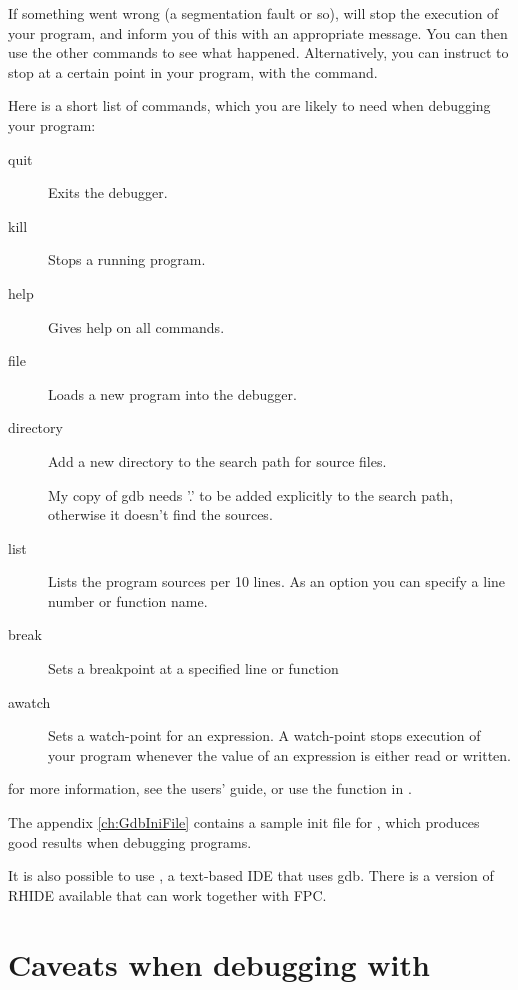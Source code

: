 If something went wrong (a segmentation fault or so),  will stop
the execution of your program, and inform you of this with an appropriate
message. You can then use the other  commands to see what happened.
Alternatively, you can instruct  to stop at a certain point in your
program, with the  command.

Here is a short list of  commands, which you are likely to need when
debugging your program:
\begin{description}
\item [quit\ ] Exits the debugger.
\item [kill\ ] Stops a running program.
\item [help\ ] Gives help on all  commands.
\item [file\ ] Loads a new program into the debugger.
\item [directory\ ] Add a new directory to the search path for source
files.\\
\begin{remark} My copy of gdb needs '.' to be added explicitly to the search
path, otherwise it doesn't find the sources.
\end{remark}
\item [list\ ] Lists the program sources per 10 lines. As an option you can
specify a line number or function name.
\item [break\ ] Sets a breakpoint at a specified line or function
\item [awatch\ ] Sets a watch-point for an expression. A watch-point stops
execution of your program whenever the value of an expression is either
read or written.
\end{description}

for more information, see the  users' guide, or use the 
function in .

The appendix {\ref{ch:GdbIniFile}} contains a sample init file for
, which produces good results when debugging \fpc programs.

It is also possible to use , a text-based IDE that uses gdb.
There is a version of RHIDE available that can work together with FPC.

\section{Caveats when debugging with }

